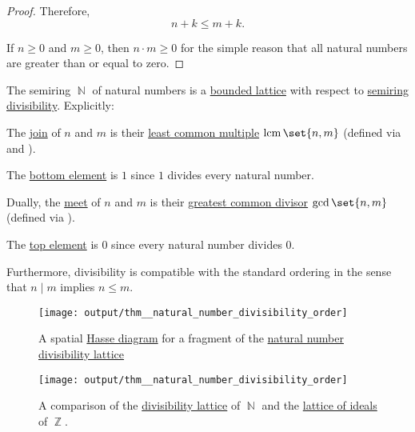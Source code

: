 \begin{proof}
  Therefore,
  \begin{equation*}
    n + k \leq m + k.
  \end{equation*}

   If \( n \geq 0 \) and \( m \geq 0 \), then \( n \cdot m \geq 0 \) for the simple reason that all natural numbers are greater than or equal to zero.
\end{proof}

\begin{proposition}\label{thm:natural_number_divisibility_lattice}
  The semiring \hyperref[def:natural_numbers]{\( \BbbN \)} of natural numbers is a \hyperref[def:semilattice/bounded]{bounded lattice} with respect to \hyperref[def:divisibility]{semiring divisibility}. Explicitly:
  \begin{thmenum}
     The \hyperref[def:semilattice/join]{join} of \( n \) and \( m \) is their \hyperref[def:gcd_and_lcm]{least common multiple} \( \lcm\set{ n, m } \) (defined via  and ).

     The \hyperref[def:extremal_points/top_and_bottom]{bottom element} is \( 1 \) since \( 1 \) divides every natural number.

     Dually, the \hyperref[def:semilattice/meet]{meet} of \( n \) and \( m \) is their \hyperref[def:gcd_and_lcm]{greatest common divisor} \( \gcd\set{ n, m } \) (defined via ).

     The \hyperref[def:extremal_points/top_and_bottom]{top element} is \( 0 \) since every natural number divides \( 0 \).
  \end{thmenum}

  Furthermore, divisibility is compatible with the standard ordering in the sense that \( n \mid m \) implies \( n \leq m \).

  \begin{figure}[!ht]
    \centering
    \texttt{[image: output/thm\_\_natural\_number\_divisibility\_order]}
    \caption{A spatial \hyperref[def:hasse_diagram]{Hasse diagram} for a fragment of the \hyperref[thm:natural_number_divisibility_lattice]{natural number divisibility lattice}}
    \label{fig:thm:natural_number_divisibility_lattice/divisibility}
  \end{figure}

  \begin{figure}[!ht]
    \centering
    \texttt{[image: output/thm\_\_natural\_number\_divisibility\_order]}
    \caption{A comparison of the \hyperref[thm:natural_number_divisibility_lattice]{divisibility lattice} of \( \BbbN \) and the \hyperref[thm:semiring_of_ideals/lattice]{lattice of ideals} of \( \BbbZ \).}
    \label{fig:thm:natural_number_divisibility_lattice/ideals}
  \end{figure}
\end{proposition}
